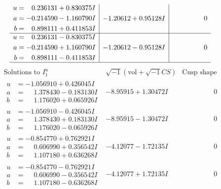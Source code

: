 \documentclass[1p]{elsarticle_modified}
\theoremstyle{definition}
\newcommand{\I}{\sqrt{-1}}
\begin{document}
$$\begin{array}{c|c|c}
\begin{aligned}
u &= \phantom{-}0.236131 + 0.830375 I \\
a &= -0.214590 - 1.160790 I \\
b &= \phantom{-}0.898111 + 0.411853 I\end{aligned}
 & -1.20612 + 0.95128 I & \phantom{-0.000000 } 0 \\ \hline\begin{aligned}
u &= \phantom{-}0.236131 - 0.830375 I \\
a &= -0.214590 + 1.160790 I \\
b &= \phantom{-}0.898111 - 0.411853 I\end{aligned}
 & -1.20612 - 0.95128 I & \phantom{-0.000000 } 0\\
 \hline 
 \end{array}$$\newpage$$\begin{array}{c|c|c}  
\text{Solutions to }I^u_{1}& \I (\text{vol} + \sqrt{-1}CS) & \text{Cusp shape}\\
 \hline 
\begin{aligned}
u &= -1.056910 + 0.426045 I \\
a &= \phantom{-}1.378430 - 0.183130 I \\
b &= \phantom{-}1.176020 + 0.065926 I\end{aligned}
 & -8.95915 + 1.30472 I & \phantom{-0.000000 } 0 \\ \hline\begin{aligned}
u &= -1.056910 - 0.426045 I \\
a &= \phantom{-}1.378430 + 0.183130 I \\
b &= \phantom{-}1.176020 - 0.065926 I\end{aligned}
 & -8.95915 - 1.30472 I & \phantom{-0.000000 } 0 \\ \hline\begin{aligned}
u &= -0.854770 + 0.762921 I \\
a &= \phantom{-}0.606990 + 0.356542 I \\
b &= \phantom{-}1.107180 + 0.636268 I\end{aligned}
 & -4.12077 - 1.72135 I & \phantom{-0.000000 } 0 \\ \hline\begin{aligned}
u &= -0.854770 - 0.762921 I \\
a &= \phantom{-}0.606990 - 0.356542 I \\
b &= \phantom{-}1.107180 - 0.636268 I\end{aligned}
 & -4.12077 + 1.72135 I & \phantom{-0.000000 } 0 \\ \hline\begin{aligned}

\end{aligned}
\end{array}$$
\end{document}
